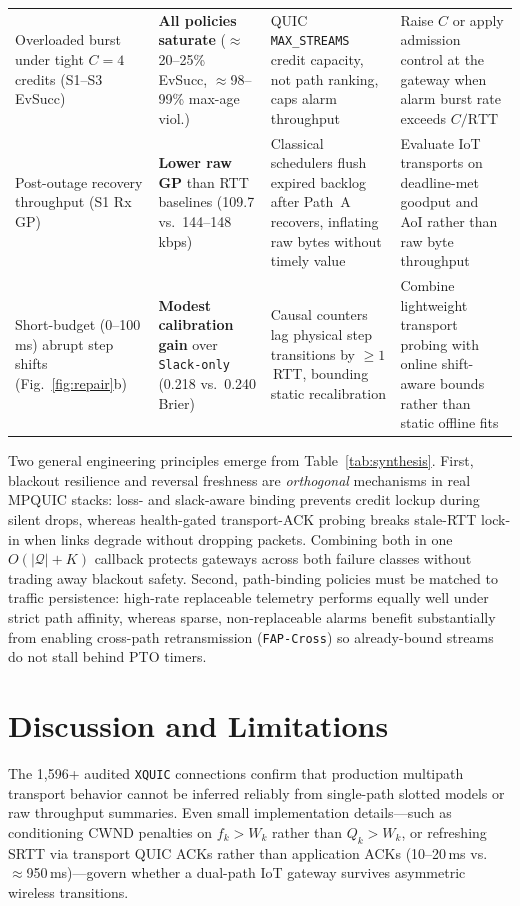 \documentclass[preprint,12pt,number]{elsarticle}
\begin{document}
\begin{table}[t]
{\begin{tabular}{@{}>{\raggedright\arraybackslash}p{2.9cm}>{\raggedright\arraybackslash}p{2.9cm}>{\raggedright\arraybackslash}p{4.3cm}>{\raggedright\arraybackslash}p{4.1cm}@{}}
Overloaded burst under tight $C{=}4$ credits (S1--S3 EvSucc) & \textbf{All policies saturate} ($\approx$20--25\% EvSucc, $\approx$98--99\% max-age viol.) & QUIC \texttt{MAX\_STREAMS} credit capacity, not path ranking, caps alarm throughput & Raise $C$ or apply admission control at the gateway when alarm burst rate exceeds $C/\text{RTT}$ \\
\addlinespace[3pt]
Post-outage recovery throughput (S1 Rx GP) & \textbf{Lower raw GP} than RTT baselines (109.7 vs.\ 144--148\,kbps) & Classical schedulers flush expired backlog after Path~A recovers, inflating raw bytes without timely value & Evaluate IoT transports on deadline-met goodput and AoI rather than raw byte throughput \\
\addlinespace[3pt]
Short-budget (0--100\,ms) abrupt step shifts (Fig.~\ref{fig:repair}b) & \textbf{Modest calibration gain} over \texttt{Slack-only} (0.218 vs.\ 0.240 Brier) & Causal counters lag physical step transitions by $\ge 1$\,RTT, bounding static recalibration & Combine lightweight transport probing with online shift-aware bounds rather than static offline fits \\
\bottomrule
\end{tabular}}
\end{table}

Two general engineering principles emerge from Table~\ref{tab:synthesis}. First, blackout resilience and reversal freshness are \emph{orthogonal} mechanisms in real MPQUIC stacks: loss- and slack-aware binding prevents credit lockup during silent drops, whereas health-gated transport-ACK probing breaks stale-RTT lock-in when links degrade without dropping packets. Combining both in one $O(|\mathcal{Q}|+K)$ callback protects gateways across both failure classes without trading away blackout safety. Second, path-binding policies must be matched to traffic persistence: high-rate replaceable telemetry performs equally well under strict path affinity, whereas sparse, non-replaceable alarms benefit substantially from enabling cross-path retransmission (\texttt{FAP-Cross}) so already-bound streams do not stall behind PTO timers.

\section{Discussion and Limitations}
\label{sec:discussion}

The 1,596+ audited \texttt{XQUIC} connections confirm that production multipath transport behavior cannot be inferred reliably from single-path slotted models or raw throughput summaries. Even small implementation details---such as conditioning CWND penalties on $f_k > W_k$ rather than $Q_k > W_k$, or refreshing SRTT via transport QUIC ACKs rather than application ACKs (10--20\,ms vs.\ $\approx$950\,ms)---govern whether a dual-path IoT gateway survives asymmetric wireless transitions.
\end{document}

